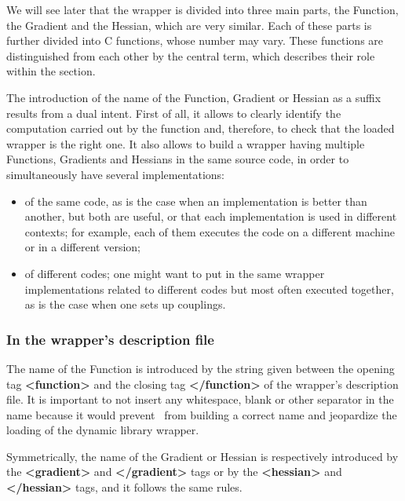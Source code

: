 We will see later that the wrapper is divided into three main parts, the Function, the Gradient and the Hessian, which are very similar. Each of these parts is further divided into C functions, whose number may vary. These functions are distinguished from each other by the central term, which describes their role within the section.

The introduction of the name of the Function, Gradient or Hessian as a suffix results from a dual intent. First of all, it allows to clearly identify the computation carried out by the function and, therefore, to check that the loaded wrapper is the right one. It also allows to build a wrapper having multiple Functions, Gradients and Hessians in the same source code, in order to simultaneously have several implementations:
\begin{itemize}
\item of the same code, as is the case when an implementation is better than another, but both are useful, or that each implementation is used in different contexts; for example, each of them executes the code on a different machine or in a different version;
\item of different codes; one might want to put in the same wrapper implementations related to different codes but most often executed together, as is the case when one sets up couplings.
\end{itemize}

\subsubsection{In the wrapper's description file}

The name of the Function is introduced by the string given between the opening tag {\bf <function>} and the closing tag {\bf </function>} of the wrapper's description file. It is important to not insert any whitespace, blank or other separator in the name because it would prevent \OT\ from building a correct name and jeopardize the loading of the dynamic library wrapper.

Symmetrically, the name of the Gradient or Hessian is respectively introduced by the {\bf <gradient>} and {\bf </gradient>} tags or by the {\bf <hessian>} and {\bf </hessian>} tags, and it follows the same rules.

